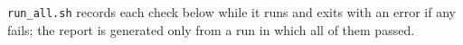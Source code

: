 \texttt{run\_all.sh} records each check below while it runs and exits with an
error if any fails; the report is generated only from a run in which all of
them passed.

